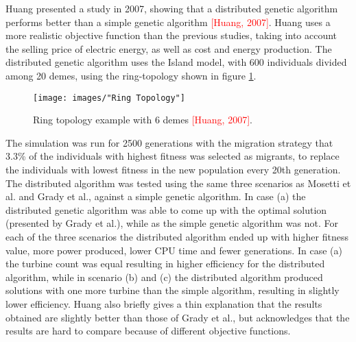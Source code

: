 \noindent Huang presented a study in 2007, showing that a distributed genetic algorithm performs better than a simple genetic algorithm \textcolor{red}{[Huang, 2007]}. Huang uses a more realistic objective function than the previous studies, taking into account the selling price of electric energy, as well as cost and energy production. The distributed genetic algorithm uses the Island model, with 600 individuals divided among 20 demes, using the ring-topology shown in figure \ref{Ring Topology}.\\

\begin{figure}[h!]
\begin{center}
\texttt{[image: images/"Ring Topology"]}
\caption{Ring topology example with 6 demes \textcolor{red}{[Huang, 2007]}.}
\label{Ring Topology}
\end{center}
\end{figure}


\noindent The simulation was run for 2500 generations with the migration strategy that 3.3\% of the individuals with highest fitness was selected as migrants, to replace the individuals with lowest fitness in the new population every 20th generation. The distributed algorithm was tested using the same three scenarios as Mosetti et al. and Grady et al., against a simple genetic algorithm. In case (a) the distributed genetic algorithm was able to come up with the optimal solution (presented by Grady et al.), while as the simple genetic algorithm was not. For each of the three scenarios the distributed algorithm ended up with higher fitness value, more power produced, lower CPU time and fewer generations. In case (a) the turbine count was equal resulting in higher efficiency for the distributed algorithm, while in scenario (b) and (c) the distributed algorithm produced solutions with one more turbine than the simple algorithm, resulting in slightly lower efficiency. Huang also briefly gives a thin explanation that the results obtained are slightly better than those of Grady et al., but acknowledges that the results are hard to compare because of different objective functions.\\


